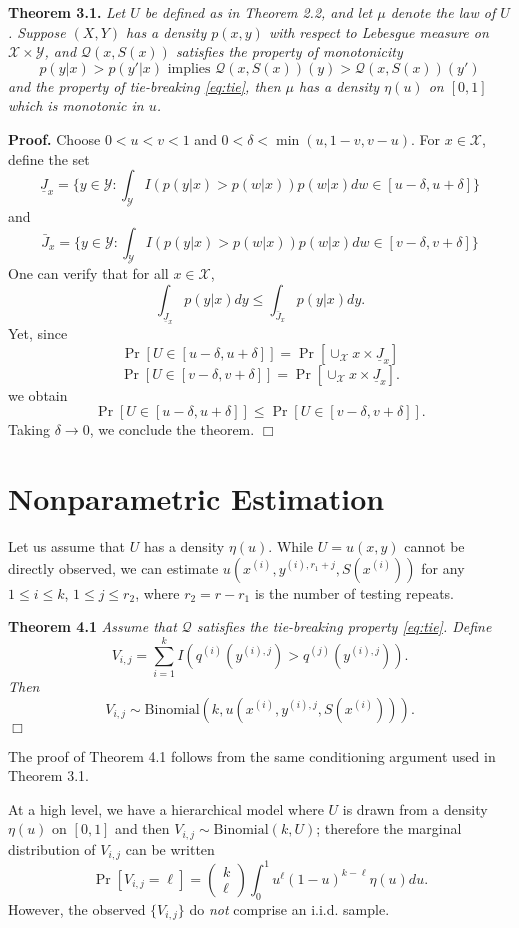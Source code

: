 \documentclass{article}
\begin{document}
\noindent\textbf{Theorem 3.1.} \emph{ Let $U$ be defined as in Theorem
  2.2, and let $\mu$ denote the law of $U$.  Suppose $(X, Y)$ has a density $p(x, y)$ with respect to 
  Lebesgue measure on $\mathcal{X} \times \mathcal{Y}$,
  and $\mathcal{Q}(x, S(x))$ satisfies the property of monotonicity
  \[
  p(y|x) > p(y'|x) \text{ implies } \mathcal{Q}(x, S(x))(y) > \mathcal{Q}(x, S(x))(y')
  \]
  and the property of tie-breaking \eqref{eq:tie},
  then $\mu$ has a density $\eta(u)$ on $[0, 1]$ which is monotonic in $u$.
}

\noindent\textbf{Proof.}
Choose $0 < u < v < 1$ and $0 < \delta < \min(u, 1-v, v-u)$.
For $x \in \mathcal{X}$, define the set 
\[
\underline{J}_x = \{y \in \mathcal{Y}: \int_\mathcal{Y} I(p(y|x) > p(w|x))p(w|x) dw \in [u - \delta, u + \delta]\}
\]
and
\[
\bar{J}_x = \{y \in \mathcal{Y}: \int_\mathcal{Y} I(p(y|x) > p(w|x))p(w|x) dw \in [v - \delta, v + \delta]\}
\]
One can verify that for all $x \in \mathcal{X}$,
\[
\int_{\underline{J}_x} p(y|x) dy \leq \int_{\bar{J}_x} p(y|x) dy.
\]
Yet, since
\[
\Pr[U \in [u-\delta, u + \delta]] = \Pr[\cup_\mathcal{X} x \times \underline{J}_x]
\]
\[
\Pr[U \in [v-\delta, v + \delta]] = \Pr[\cup_\mathcal{X} x \times \underline{J}_x].
\]
we obtain
\[
\Pr[U \in [u-\delta, u + \delta]] \leq \Pr[U \in [v - \delta, v + \delta]].
\]
Taking $\delta \to 0$, we conclude the theorem. $\Box$


\section{Nonparametric Estimation}

Let us assume that $U$ has a density $\eta(u)$.
While $U = u(x, y)$ cannot be directly observed, we can estimate $u(x^{(i)}, y^{(i), r_1 + j}, S(x^{(i)}))$ for any $1 \leq i \leq k$,
$1 \leq j \leq r_2$, where $r_2 = r - r_1$ is the number of testing repeats.

\noindent\textbf{Theorem 4.1}\emph{
Assume that $\mathcal{Q}$ satisfies the tie-breaking property \eqref{eq:tie}.
Define
\[
V_{i, j} = \sum_{i=1}^k I(q^{(i)}(y^{(i), j}) > q^{(j)}(y^{(i), j})).
\]
Then
\[
V_{i, j} \sim \text{Binomial}(k, u(x^{(i)}, y^{(i), j}, S(x^{(i)}))).
\]}
$\Box$

The proof of Theorem 4.1 follows from the same conditioning argument used in Theorem 3.1.

At a high level, we have a hierarchical model where $U$ is drawn from a density $\eta(u)$ on $[0, 1]$
and then $V_{i, j} \sim \text{Binomial}(k, U)$;
therefore the marginal distribution of $V_{i, j}$ can be written
\[
\Pr[V_{i,j} = \ell] = \begin{pmatrix}
k \\ \ell
\end{pmatrix}
\int_0^1 u^\ell (1-u)^{k-\ell} \eta(u) du.
\]
However, the observed $\{V_{i, j}\}$ do \emph{not} comprise an i.i.d. sample.
\end{document}
